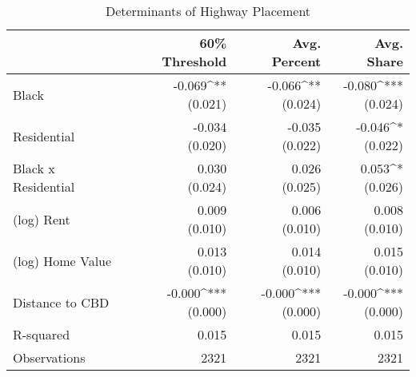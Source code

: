 \begin{table}[h]
\centering
\caption{Determinants of Highway Placement}
\label{tab:initial_results}
\begin{tabular*}{\textwidth}{@{\extracolsep{\fill}}l*{3}{r}}
\toprule
 & 60\% Threshold & Avg. Percent & Avg. Share \\
\midrule
Black & \makecell[tr]{-0.069^{**} \\ (0.021)} & \makecell[tr]{-0.066^{**} \\ (0.024)} & \makecell[tr]{-0.080^{***} \\ (0.024)} \\
Residential & \makecell[tr]{-0.034 \\ (0.020)} & \makecell[tr]{-0.035 \\ (0.022)} & \makecell[tr]{-0.046^{*} \\ (0.022)} \\
Black x Residential & \makecell[tr]{0.030 \\ (0.024)} & \makecell[tr]{0.026 \\ (0.025)} & \makecell[tr]{0.053^{*} \\ (0.026)} \\
(log) Rent & \makecell[tr]{0.009 \\ (0.010)} & \makecell[tr]{0.006 \\ (0.010)} & \makecell[tr]{0.008 \\ (0.010)} \\
(log) Home Value & \makecell[tr]{0.013 \\ (0.010)} & \makecell[tr]{0.014 \\ (0.010)} & \makecell[tr]{0.015 \\ (0.010)} \\
Distance to CBD & \makecell[tr]{-0.000^{***} \\ (0.000)} & \makecell[tr]{-0.000^{***} \\ (0.000)} & \makecell[tr]{-0.000^{***} \\ (0.000)} \\
R-squared & 0.015 & 0.015 & 0.015 \\
Observations & 2321 & 2321 & 2321 \\
\bottomrule
\end{tabular*}
\end{table}
